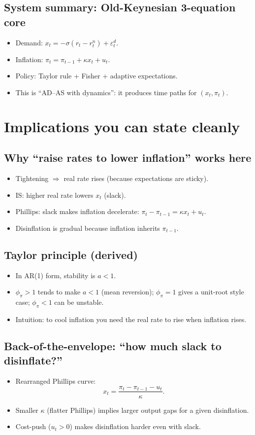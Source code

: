 \documentclass[11pt]{article}
\begin{document}
\subsection*{System summary: Old-Keynesian 3-equation core}
\begin{itemize}
\item Demand: $x_t=-\sigma(r_t-r_t^{n})+\varepsilon_t^{d}$.
\item Inflation: $\pi_t=\pi_{t-1}+\kappa x_t+u_t$.
\item Policy: Taylor rule + Fisher + adaptive expectations.
\item This is ``AD--AS with dynamics'': it produces time paths for $(x_t,\pi_t)$.
\end{itemize}

\section{Implications you can state cleanly}

\subsection*{Why ``raise rates to lower inflation'' works here}
\begin{itemize}
\item Tightening $\Rightarrow$ real rate rises (because expectations are sticky).
\item IS: higher real rate lowers $x_t$ (slack).
\item Phillips: slack makes inflation decelerate: $\pi_t-\pi_{t-1}=\kappa x_t+u_t$.
\item Disinflation is gradual because inflation inherits $\pi_{t-1}$.
\end{itemize}

\subsection*{Taylor principle (derived)}
\begin{itemize}
\item In AR(1) form, stability is $a<1$.
\item $\phi_\pi>1$ tends to make $a<1$ (mean reversion); $\phi_\pi=1$ gives a unit-root style case; $\phi_\pi<1$ can be unstable.
\item Intuition: to cool inflation you need the real rate to rise when inflation rises.
\end{itemize}

\subsection*{Back-of-the-envelope: ``how much slack to disinflate?''}
\begin{itemize}
\item Rearranged Phillips curve:
\[
x_t=\frac{\pi_t-\pi_{t-1}-u_t}{\kappa}.
\]
\item Smaller $\kappa$ (flatter Phillips) implies larger output gaps for a given disinflation.
\item Cost-push ($u_t>0$) makes disinflation harder even with slack.
\end{itemize}
\end{document}
